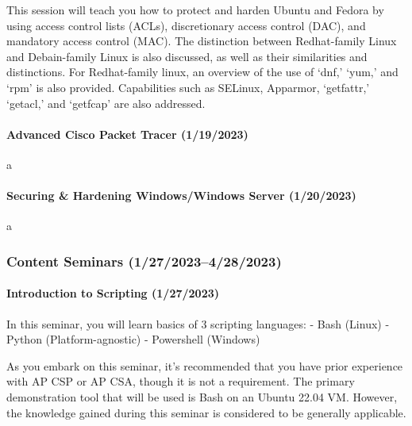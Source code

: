 \documentclass[
  letterpaper,
  DIV=11,
  numbers=noendperiod]{scrartcl}
\let\oldparagraph\paragraph
\renewcommand{\paragraph}[1]{\oldparagraph{#1}\mbox{}}
\begin{document}
This session will teach you how to protect and harden Ubuntu and Fedora
by using access control lists (ACLs), discretionary access control
(DAC), and mandatory access control (MAC). The distinction between
Redhat-family Linux and Debain-family Linux is also discussed, as well
as their similarities and distinctions. For Redhat-family linux, an
overview of the use of `dnf,' `yum,' and `rpm' is also provided.
Capabilities such as SELinux, Apparmor, `getfattr,' `getacl,' and
`getfcap' are also addressed.

\newpage{}

\hypertarget{advanced-cisco-packet-tracer-1192023}{%
\paragraph{Advanced Cisco Packet Tracer
(1/19/2023)}\label{advanced-cisco-packet-tracer-1192023}}

a

\hypertarget{securing-hardening-windowswindows-server-1202023}{%
\paragraph{Securing \& Hardening Windows/Windows Server
(1/20/2023)}\label{securing-hardening-windowswindows-server-1202023}}

a

\hypertarget{content-seminars-12720234282023}{%
\subsubsection{Content Seminars
(1/27/2023--4/28/2023)}\label{content-seminars-12720234282023}}

\hypertarget{introduction-to-scripting-1272023}{%
\paragraph{Introduction to Scripting
(1/27/2023)}\label{introduction-to-scripting-1272023}}

In this seminar, you will learn basics of 3 scripting languages: - Bash
(Linux) - Python (Platform-agnostic) - Powershell (Windows)

As you embark on this seminar, it's recommended that you have prior
experience with AP CSP or AP CSA, though it is not a requirement. The
primary demonstration tool that will be used is Bash on an Ubuntu 22.04
VM. However, the knowledge gained during this seminar is considered to
be generally applicable.
\end{document}
